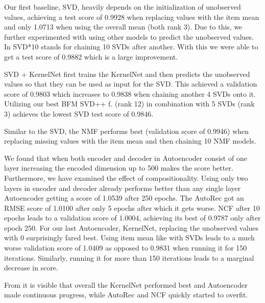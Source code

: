 \documentclass[10pt,conference,compsocconf]{IEEEtran}
\begin{document}
    Our first baseline, SVD, heavily depends on the initialization of unobserved values, achieving a test score of 0.9928 when replacing values with the item mean and only 1.0713 when using the overall mean (both rank 3).
    Due to this, we further experimented with using other models to predict the unobserved values.
    In  SVD*10 stands for chaining 10 SVDs after another.
    With this we were able to get a test score of 0.9882 which is a large improvement.

    SVD + KernelNet first trains the KernelNet and then predicts the unobserved values so that they can be used as input for the SVD.
    This achieved a validation score of 0.9803 which increases to 0.9838 when chaining another 4 SVDs onto it.
    Utilizing our best BFM SVD++ f. (rank 12) in combination with 5 SVDs (rank 3) achieves the lowest SVD test score of 0.9846.

    Similar to the SVD, the NMF performs best (validation score of 0.9946) when replacing missing values with the item mean and then chaining 10 NMF models.

    We found that when both encoder and decoder in Autoencoder consist of one layer increasing the encoded dimension up to 500 makes
    the score better.
    Furthermore, we have examined the effect of compositionality.
    Using only two layers in encoder and decoder already performs better than any single layer Autoencoder getting a score of 1.0539 after 250 epochs.
    The AutoRec got an RMSE score of 1.0100 after only 5 epochs after which it gets worse.
    NCF after 10 epochs leads to a validation score of 1.0004, achieving its best of 0.9787 only after epoch 250.
    For our last Autoencoder, KernelNet, replacing the unobserved values with 0 surprisingly fared best.
    Using item mean like with SVDs leads to a much worse validation score of 1.0409 as opposed to 0.9831 when running it for 150 iterations.
    Similarly, running it for more than 150 iterations leads to a marginal decrease in score.

    From   it is visible that overall the KernelNet performed best and Autoencoder made continuous progress, while AutoRec and NCF quickly started to overfit.
\end{document}
